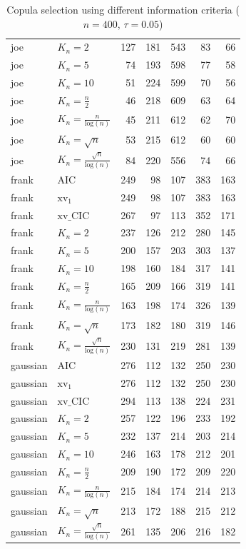 \begin{table}[htbp]
\begin{tabular}{llrrrrr}
  joe & $K_{n}=2$ & 127 & 181 & 543 & 83 & 66 \\ 
  joe & $K_{n}=5$ & 74 & 193 & 598 & 77 & 58 \\ 
  joe & $K_{n}=10$ & 51 & 224 & 599 & 70 & 56 \\ 
  joe & $K_{n}=\tfrac{n}{2}$ & 46 & 218 & 609 & 63 & 64 \\ 
  joe & $K_{n}=\tfrac{n}{\text{log}(n)}$ & 45 & 211 & 612 & 62 & 70 \\ 
  joe & $K_{n}=\sqrt{n}$ & 53 & 215 & 612 & 60 & 60 \\ 
  joe & $K_{n}=\tfrac{\sqrt{n}}{\text{log}(n)}$ & 84 & 220 & 556 & 74 & 66 \\ 
   \hdashline
frank & AIC & 249 & 98 & 107 & 383 & 163 \\ 
  frank & $\text{xv}_{1}$ & 249 & 98 & 107 & 383 & 163 \\ 
  frank & $\text{xv}\_\text{CIC}$ & 267 & 97 & 113 & 352 & 171 \\ 
  frank & $K_{n}=2$ & 237 & 126 & 212 & 280 & 145 \\ 
  frank & $K_{n}=5$ & 200 & 157 & 203 & 303 & 137 \\ 
  frank & $K_{n}=10$ & 198 & 160 & 184 & 317 & 141 \\ 
  frank & $K_{n}=\tfrac{n}{2}$ & 165 & 209 & 166 & 319 & 141 \\ 
  frank & $K_{n}=\tfrac{n}{\text{log}(n)}$ & 163 & 198 & 174 & 326 & 139 \\ 
  frank & $K_{n}=\sqrt{n}$ & 173 & 182 & 180 & 319 & 146 \\ 
  frank & $K_{n}=\tfrac{\sqrt{n}}{\text{log}(n)}$ & 230 & 131 & 219 & 281 & 139 \\ 
   \hdashline
gaussian & AIC & 276 & 112 & 132 & 250 & 230 \\ 
  gaussian & $\text{xv}_{1}$ & 276 & 112 & 132 & 250 & 230 \\ 
  gaussian & $\text{xv}\_\text{CIC}$ & 294 & 113 & 138 & 224 & 231 \\ 
  gaussian & $K_{n}=2$ & 257 & 122 & 196 & 233 & 192 \\ 
  gaussian & $K_{n}=5$ & 232 & 137 & 214 & 203 & 214 \\ 
  gaussian & $K_{n}=10$ & 246 & 163 & 178 & 212 & 201 \\ 
  gaussian & $K_{n}=\tfrac{n}{2}$ & 209 & 190 & 172 & 209 & 220 \\ 
  gaussian & $K_{n}=\tfrac{n}{\text{log}(n)}$ & 215 & 184 & 174 & 214 & 213 \\ 
  gaussian & $K_{n}=\sqrt{n}$ & 213 & 172 & 188 & 215 & 212 \\ 
  gaussian & $K_{n}=\tfrac{\sqrt{n}}{\text{log}(n)}$ & 261 & 135 & 206 & 216 & 182 \\ 
   \hline
\end{tabular}
\caption{Copula selection using different information criteria ($n = 400$, $\tau = 0.05$)} 
\end{table}


